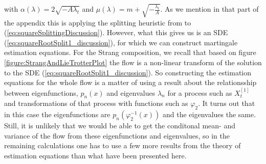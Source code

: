 with $\alpha(\lambda) = 2\sqrt{-A\lambda_t}$ and $\mu(\lambda) = m + \sqrt{-\frac{\lambda_t}{A}}$. As we mention in that part of the appendix this is applying the splitting heuristic from \cite{SplittingSchemes} to (\ref{eq:squareSplittingDiscussion}). However, what this gives us is an SDE (\ref{eq:squareRootSplit1_discussion}), for which we can construct martingale estimation equations. For the Strang composition, we recall that based on figure \ref{figure:StrangAndLieTrotterPlot} the flow is a non-linear transform of the solution to the SDE (\ref{eq:squareRootSplit1_discussion}). So constructing the estimation equations for the whole flow is a matter of using a result about the relationsship between eigenfunctions, $p_n(x)$ and eigenvalues $\lambda_n$ for a process such as $X_t^{[1]}$ and transformations of that process with functions such as $\varphi_2$. It turns out \cite[remark on p. 41]{StatisticalMethodsForSDE} that in this case the eigenfunctions are $p_n\left(\varphi_2^{-1}(x)\right)$ and the eigenvalues the same. Still, it is unlikely that we would be able to get the conditonal mean- and variance  of the flow from these eigenfunctions and eigenvalues, so in the remaining calculations one has to use a few more results from the theory of estimation equations than what have been presented here.
